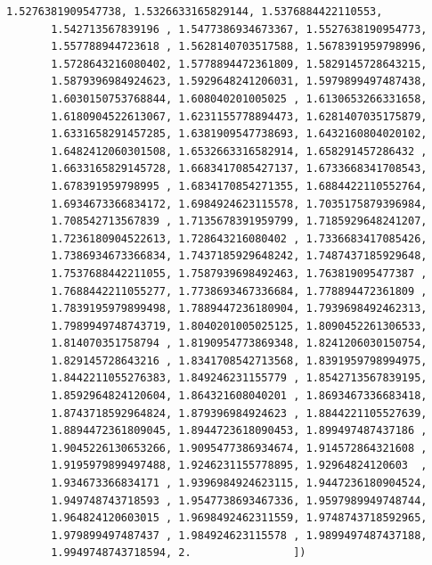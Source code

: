 \documentclass[11pt]{article}
\begin{document}
\begin{tcolorbox}[breakable, size=fbox, boxrule=.5pt, pad at break*=1mm, opacityfill=0]
\begin{Verbatim}[commandchars=\\\{\}]
       1.5276381909547738, 1.5326633165829144, 1.5376884422110553,
       1.542713567839196 , 1.5477386934673367, 1.5527638190954773,
       1.557788944723618 , 1.5628140703517588, 1.5678391959798996,
       1.5728643216080402, 1.5778894472361809, 1.5829145728643215,
       1.5879396984924623, 1.5929648241206031, 1.5979899497487438,
       1.6030150753768844, 1.608040201005025 , 1.6130653266331658,
       1.6180904522613067, 1.6231155778894473, 1.6281407035175879,
       1.6331658291457285, 1.6381909547738693, 1.6432160804020102,
       1.6482412060301508, 1.6532663316582914, 1.658291457286432 ,
       1.6633165829145728, 1.6683417085427137, 1.6733668341708543,
       1.678391959798995 , 1.6834170854271355, 1.6884422110552764,
       1.6934673366834172, 1.6984924623115578, 1.7035175879396984,
       1.708542713567839 , 1.7135678391959799, 1.7185929648241207,
       1.7236180904522613, 1.728643216080402 , 1.7336683417085426,
       1.7386934673366834, 1.7437185929648242, 1.7487437185929648,
       1.7537688442211055, 1.7587939698492463, 1.763819095477387 ,
       1.7688442211055277, 1.7738693467336684, 1.778894472361809 ,
       1.7839195979899498, 1.7889447236180904, 1.7939698492462313,
       1.7989949748743719, 1.8040201005025125, 1.8090452261306533,
       1.814070351758794 , 1.8190954773869348, 1.8241206030150754,
       1.829145728643216 , 1.8341708542713568, 1.8391959798994975,
       1.8442211055276383, 1.849246231155779 , 1.8542713567839195,
       1.8592964824120604, 1.864321608040201 , 1.8693467336683418,
       1.8743718592964824, 1.879396984924623 , 1.8844221105527639,
       1.8894472361809045, 1.8944723618090453, 1.899497487437186 ,
       1.9045226130653266, 1.9095477386934674, 1.914572864321608 ,
       1.9195979899497488, 1.9246231155778895, 1.92964824120603  ,
       1.934673366834171 , 1.9396984924623115, 1.9447236180904524,
       1.949748743718593 , 1.9547738693467336, 1.9597989949748744,
       1.964824120603015 , 1.9698492462311559, 1.9748743718592965,
       1.979899497487437 , 1.984924623115578 , 1.9899497487437188,
       1.9949748743718594, 2.                ])
\end{Verbatim}
\end{tcolorbox}
        
\end{document}
